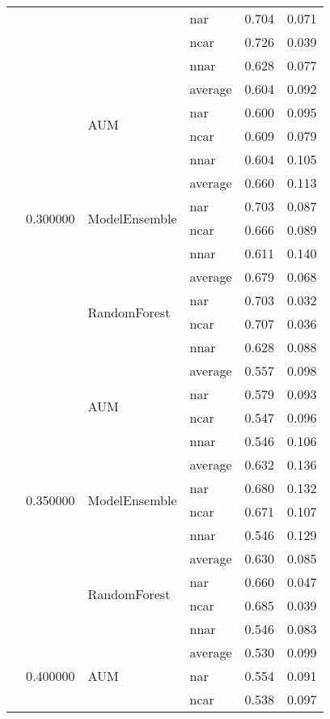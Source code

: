 \begin{longtable}{llllrr}
 &  &  & nar & 0.704 & 0.071 \\
 &  &  & ncar & 0.726 & 0.039 \\
 &  &  & nnar & 0.628 & 0.077 \\
\cline{2-6} \cline{3-6}
 & \multirow[t]{12}{*}{0.300000} & \multirow[t]{4}{*}{AUM} & average & 0.604 & 0.092 \\
 &  &  & nar & 0.600 & 0.095 \\
 &  &  & ncar & 0.609 & 0.079 \\
 &  &  & nnar & 0.604 & 0.105 \\
\cline{3-6}
 &  & \multirow[t]{4}{*}{ModelEnsemble} & average & 0.660 & 0.113 \\
 &  &  & nar & 0.703 & 0.087 \\
 &  &  & ncar & 0.666 & 0.089 \\
 &  &  & nnar & 0.611 & 0.140 \\
\cline{3-6}
 &  & \multirow[t]{4}{*}{RandomForest} & average & 0.679 & 0.068 \\
 &  &  & nar & 0.703 & 0.032 \\
 &  &  & ncar & 0.707 & 0.036 \\
 &  &  & nnar & 0.628 & 0.088 \\
\cline{2-6} \cline{3-6}
 & \multirow[t]{12}{*}{0.350000} & \multirow[t]{4}{*}{AUM} & average & 0.557 & 0.098 \\
 &  &  & nar & 0.579 & 0.093 \\
 &  &  & ncar & 0.547 & 0.096 \\
 &  &  & nnar & 0.546 & 0.106 \\
\cline{3-6}
 &  & \multirow[t]{4}{*}{ModelEnsemble} & average & 0.632 & 0.136 \\
 &  &  & nar & 0.680 & 0.132 \\
 &  &  & ncar & 0.671 & 0.107 \\
 &  &  & nnar & 0.546 & 0.129 \\
\cline{3-6}
 &  & \multirow[t]{4}{*}{RandomForest} & average & 0.630 & 0.085 \\
 &  &  & nar & 0.660 & 0.047 \\
 &  &  & ncar & 0.685 & 0.039 \\
 &  &  & nnar & 0.546 & 0.083 \\
\cline{2-6} \cline{3-6}
 & \multirow[t]{12}{*}{0.400000} & \multirow[t]{4}{*}{AUM} & average & 0.530 & 0.099 \\
 &  &  & nar & 0.554 & 0.091 \\
 &  &  & ncar & 0.538 & 0.097 \\

\end{longtable}
